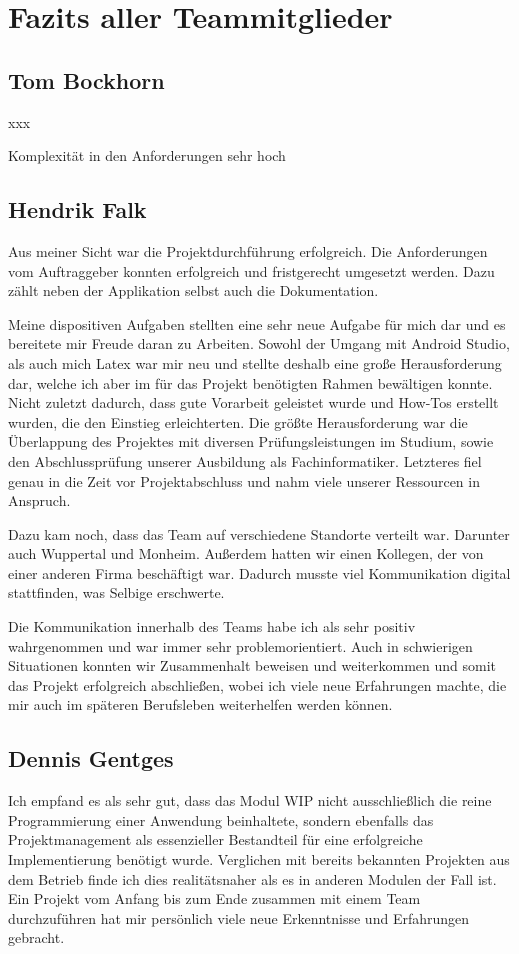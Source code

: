 \section{Fazits aller Teammitglieder}

\subsection{Tom Bockhorn}
xxx

Komplexität in den Anforderungen sehr hoch

\subsection{Hendrik Falk}
Aus meiner Sicht war die Projektdurchführung erfolgreich. Die Anforderungen vom Auftraggeber konnten erfolgreich und fristgerecht umgesetzt werden. Dazu zählt neben der Applikation selbst auch die Dokumentation. 

Meine dispositiven Aufgaben stellten eine sehr neue Aufgabe für mich dar und es bereitete mir Freude daran zu Arbeiten. Sowohl der Umgang mit Android Studio, als auch mich Latex war mir neu und stellte deshalb eine große Herausforderung dar, welche ich aber im für das Projekt benötigten Rahmen bewältigen konnte. Nicht zuletzt dadurch, dass gute Vorarbeit geleistet wurde und How-Tos erstellt wurden, die den Einstieg erleichterten. Die größte Herausforderung war die Überlappung des Projektes mit diversen Prüfungsleistungen im Studium, sowie den Abschlussprüfung unserer Ausbildung als Fachinformatiker. Letzteres fiel genau in die Zeit vor Projektabschluss und nahm viele unserer Ressourcen in Anspruch. 

Dazu kam noch, dass das Team auf verschiedene Standorte verteilt war. Darunter auch Wuppertal und Monheim. Außerdem hatten wir einen Kollegen, der von einer anderen Firma beschäftigt war. Dadurch musste viel Kommunikation digital stattfinden, was Selbige erschwerte. 

Die Kommunikation innerhalb des Teams habe ich als sehr positiv wahrgenommen und war immer sehr problemorientiert. Auch in schwierigen Situationen konnten wir Zusammenhalt beweisen und weiterkommen und somit das Projekt erfolgreich abschließen, wobei ich viele neue Erfahrungen machte, die mir auch im späteren Berufsleben weiterhelfen werden können.


\subsection{Dennis Gentges}
Ich empfand es als sehr gut, dass das Modul WIP nicht ausschließlich die reine Programmierung einer Anwendung beinhaltete, sondern ebenfalls das Projektmanagement als essenzieller Bestandteil für eine erfolgreiche Implementierung benötigt wurde. Verglichen mit bereits bekannten Projekten aus dem Betrieb finde ich dies realitätsnaher als es in anderen Modulen der Fall ist. Ein Projekt vom Anfang bis zum Ende zusammen mit einem Team durchzuführen hat mir persönlich viele neue Erkenntnisse und Erfahrungen gebracht.

